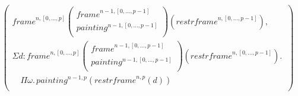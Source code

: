 \documentclass{article}
\newcommand{\myframe}{\mathit{frame}}
\newcommand{\painting}{\mathit{painting}}
\newcommand{\restrframe}{\mathit{restrframe}}
\begin{document}
\begin{enumerate}
$$\begin{array}{llcl}
            \left(\begin{array}{l}
                      \myframe^{n,[0,...,p]}
                      \left(\begin{array}{l}
                          \myframe^{n-1,[0,...,p-1]}  \\
                          \painting^{n-1,[0,...,p-1]} \\
                        \end{array}\right)(\restrframe^{n,[0,...,p-1]}), \\
                      \Sigma d:\myframe^{n,[0,...,p]}
                      \left(\begin{array}{l}
                          \myframe^{n-1,[0,...,p-1]}  \\
                          \painting^{n-1,[0,...,p-1]} \\
                        \end{array}\right)(\restrframe^{n,[0,...,p-1]}).\, \\
                      \quad \Pi\omega.\,\painting^{n-1,p}(\restrframe^{n,p}(d))     \\
                    \end{array}\right)                    \\
          \end{array}
        $$


\end{enumerate}
\end{document}
